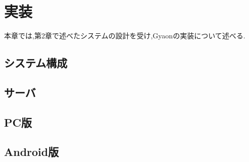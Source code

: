 \chapter{実装}
\label{chap:implementation}

本章では,第2章で述べたシステムの設計を受け,Gyaonの実装について述べる.

\newpage

\section{システム構成}

\section{サーバ}

\section{PC版}

\section{Android版}
